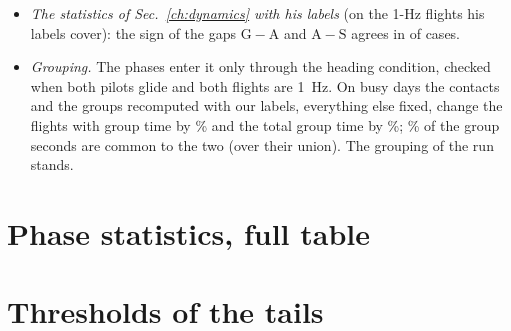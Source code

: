 \documentclass[10pt,a4paper]{article}
\newcommand{\G}{\mathrm{G}}
\newcommand{\A}{\mathrm{A}}
\newcommand{\Sl}{\mathrm{S}}
\newenvironment{step}{\begin{description}[leftmargin=0pt, itemsep=7pt, topsep=8pt]}{\end{description}}
\begin{document}
\begin{step}
\begin{itemize}
    count every run labelled search; the statistics of the text count fewer, since the context rule of
    Sec.~\ref{phases} sets the exits apart.
  \item \emph{The statistics of Sec.~\ref{ch:dynamics} with his labels} (on the 1-Hz flights his labels cover): the
    sign of the gaps $\G-\A$ and $\A-\Sl$ agrees in \PhSignAgree{} of \PhSignTotal{} cases.
  \item \emph{Grouping.} The phases enter it only through the heading condition, checked when both pilots glide
    and both flights are 1~Hz. On \GroupCheckDays{} busy days the contacts and the groups recomputed with our labels,
    everything else fixed, change the flights with group time by \GroupCheckFlightsChange\% and the total group time
    by \GroupCheckTimeChange\%; \GroupCheckShared\% of the group seconds are common to the two (over their union).
    The grouping of the run stands.
  \end{itemize}
\end{step}

\section{Phase statistics, full table}\label{app:phases-table}

\begin{table}[H]
\centering
{}
\caption{Every phase statistic: $\G-\A$ and $\A-\Sl$ per ground class, 90\% bands. Our labels.}
\end{table}

\section{Thresholds of the tails}\label{app:tails}
\end{document}
